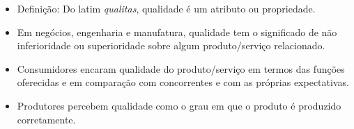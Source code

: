 
\lecturetitle{\course}{\insertlecture}

\frame{\maketitle}

\begin{frame}{\insertlecture}

\begin{itemize}[<+->]
\item  Definição: Do latim \emph{qualitas}, qualidade é um atributo ou
  propriedade.

\item  Em negócios, engenharia e manufatura, qualidade tem o significado de
  não inferioridade ou superioridade sobre algum produto/serviço
  relacionado.

\item  Consumidores encaram qualidade do produto/serviço em termos das
  funções oferecidas e em comparação com concorrentes e com as
  próprias expectativas.

\item  Produtores percebem qualidade como o grau em que o produto é
  produzido corretamente.
\end{itemize}

\end{frame}


